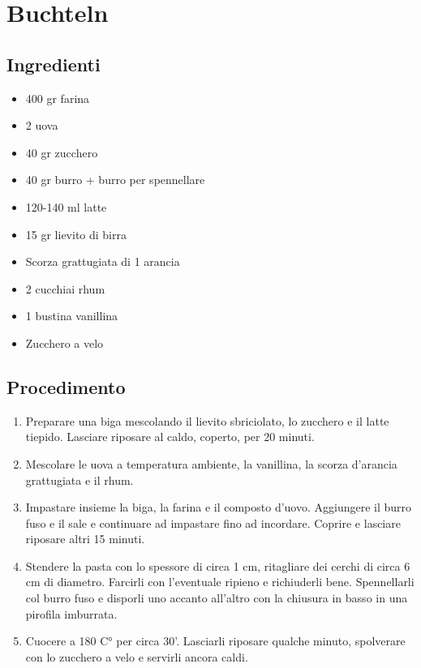 \section{Buchteln}
\subsection{Ingredienti}
\begin{itemize}
\item 400 gr farina  
\item 2 uova  
\item 40 gr zucchero  
\item 40 gr burro + burro per spennellare  
\item 120-140 ml latte  
\item 15 gr lievito di birra  
\item Scorza grattugiata di 1 arancia  
\item 2 cucchiai rhum  
\item 1 bustina vanillina  
\item Zucchero a velo
\end{itemize}
\subsection{Procedimento}
\begin{enumerate}
\item  Preparare una biga mescolando il lievito sbriciolato, lo zucchero e il latte tiepido. Lasciare riposare al caldo, coperto, per 20 minuti.  
\item  Mescolare le uova a temperatura ambiente, la vanillina, la scorza d'arancia grattugiata e il rhum.  
\item  Impastare insieme la biga, la farina e il composto d'uovo. Aggiungere il burro fuso e il sale e continuare ad impastare fino ad incordare. Coprire e lasciare riposare altri 15 minuti.  
\item  Stendere la pasta con lo spessore di circa 1 cm, ritagliare dei cerchi di circa 6 cm di diametro. Farcirli con l'eventuale ripieno e richiuderli bene. Spennellarli col burro fuso e disporli uno accanto all'altro con la chiusura in basso in una pirofila imburrata.  
\item  Cuocere a 180 C° per circa 30'. Lasciarli riposare qualche minuto, spolverare con lo zucchero a velo e servirli ancora caldi.
\end{enumerate}
